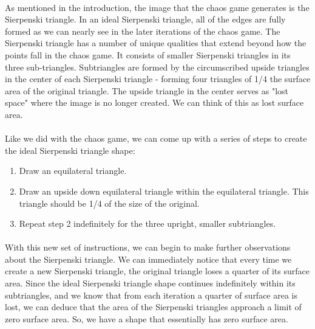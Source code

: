 \documentclass{article}
\begin{document}
\paragraph{}
As mentioned in the introduction, the image that the chaos game generates is the Sierpenski triangle. In an ideal Sierpenski triangle, all of the edges are fully formed as we can nearly see in the later iterations of the chaos game. The Sierpenski triangle has a number of unique qualities that extend beyond how the points fall in the chaos game. It consists of smaller Sierpenski triangles in its three sub-triangles. Subtriangles are formed by the circumscribed upside triangles in the center of each Sierpenski triangle - forming four triangles of 1/4 the surface area of the original triangle. The upside triangle in the center serves as "lost space" where the image is no longer created. We can think of this as lost surface area.
\paragraph{}
Like we did with the chaos game, we can come up with a series of steps to create the ideal Sierpenski triangle shape:
\begin{enumerate}
    \item Draw an equilateral triangle.
    \item Draw an upside down equilateral triangle within the equilateral triangle. This triangle should be 1/4 of the size of the original.
    \item Repeat step 2 indefinitely for the three upright, smaller subtriangles.
\end{enumerate}
\paragraph{}
With this new set of instructions, we can begin to make further observations about the Sierpenski triangle. We can immediately notice that every time we create a new Sierpenski triangle, the original triangle loses a quarter of its surface area. Since the ideal Sierpenski triangle shape continues indefinitely within its subtriangles, and we know that from each iteration a quarter of surface area is lost, we can deduce that the area of the Sierpenski triangles approach a limit of zero surface area. So, we have a shape that essentially has zero surface area.
\end{document}

